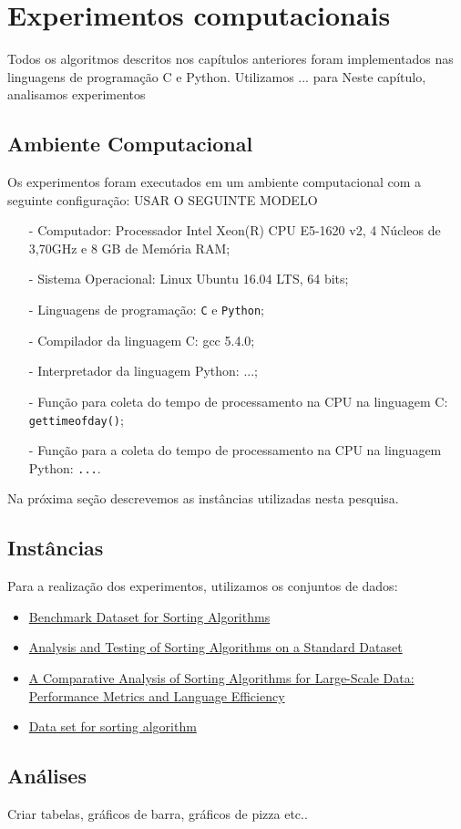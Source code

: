 \chapter{Experimentos computacionais}

Todos os algoritmos descritos nos capítulos anteriores foram implementados nas linguagens de programação C e Python. Utilizamos ... para 
Neste capítulo, analisamos experimentos 
\section{Ambiente Computacional}
\label{sec:Env}
Os experimentos foram executados em um ambiente computacional com a seguinte configuração: USAR O SEGUINTE MODELO 
\begin{itemize}
    \item[-] Computador: Processador Intel Xeon(R) CPU E5-1620 v2, 4 Núcleos de 3,70GHz e 8 GB de Memória RAM;
    \item[-] Sistema Operacional: Linux Ubuntu 16.04 LTS, 64 bits;
    \item[-] Linguagens de programação: \texttt{C} e \texttt{Python};
    \item[-] Compilador da linguagem C: gcc 5.4.0;
    \item[-] Interpretador da linguagem Python: ...;
    \item[-] Função para coleta do tempo de processamento na CPU na linguagem C: \texttt{gettimeofday()};
    \item[-] Função para a coleta do tempo de processamento na CPU na linguagem Python: \texttt{...}.
\end{itemize}


Na próxima seção descrevemos as instâncias utilizadas nesta pesquisa.

\section{Instâncias}
\label{sec:Inst}
Para a realização dos experimentos, utilizamos os conjuntos de dados:
\begin{itemize}
\item 
\href{https://www.kaggle.com/datasets/bekiremirhanakay/benchmark-dataset-for-sorting-algorithms}{Benchmark Dataset for Sorting Algorithms}

\item 
\href{https://ieeexplore.ieee.org/document/7280062}{Analysis and Testing of Sorting Algorithms on a Standard Dataset}

\item 
\href{https://link.springer.com/chapter/10.1007/978-981-97-5703-9_8}{A Comparative Analysis of Sorting Algorithms for Large-Scale Data: Performance Metrics and Language Efficiency}

\item 
\href{https://www.kaggle.com/datasets/wazahathussain/data-set-for-sorting-algorithm}{Data set for sorting algorithm}

\end{itemize}

\section{Análises}
Criar tabelas, gráficos de barra, gráficos de pizza etc.. 
